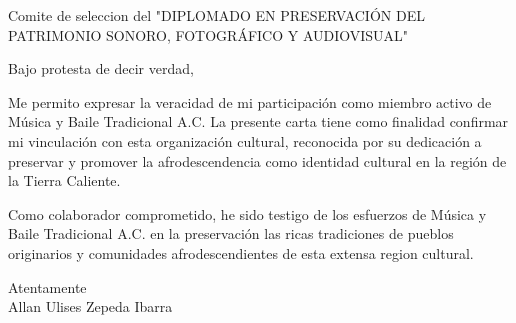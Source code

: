 \documentclass[a4paper,10pt]{letter}
\begin{document}
\begin{letter}{Comite de seleccion del "DIPLOMADO EN PRESERVACIÓN DEL PATRIMONIO SONORO, FOTOGRÁFICO Y AUDIOVISUAL"\\}

\opening{Bajo protesta de decir verdad,}

Me permito expresar la veracidad de mi participación como miembro activo de Música y Baile Tradicional A.C. La presente carta tiene como finalidad confirmar mi vinculación con esta organización cultural, reconocida por su dedicación a preservar y promover la afrodescendencia como identidad cultural en la región de la Tierra Caliente.

Como colaborador comprometido, he sido testigo de los esfuerzos de Música y Baile Tradicional A.C. en la preservación las ricas tradiciones de pueblos originarios y comunidades afrodescendientes de esta extensa region cultural. 


\closing{Atentamente \\ Allan Ulises Zepeda Ibarra}

\end{letter}
\end{document}
